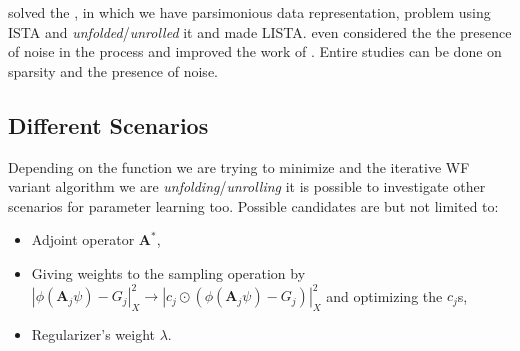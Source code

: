 \cite{Daubechies2003} solved the \srp\index{\srp}, in which we have parsimonious 
\cite{Foucart2013} data representation, problem using \ac{ISTA} and \cite{Gregor2010} 
\emph{unfolded}/\emph{unrolled} it and made \ac{LISTA}. 
\cite{Aberdam2020} even considered the the presence of noise in the process and improved the work of \cite{Gregor2010}. 
Entire studies can be done on sparsity and the presence of noise.

\subsection*{Different Scenarios}

Depending on the function we are trying to minimize and the iterative \ac{WF}\cite{Jaganathan2015}\cite{Liu2019} variant algorithm we are \emph{unfolding}/\emph{unrolling} 
it is possible to investigate other scenarios for parameter learning too. Possible candidates are but not limited to:
\begin{itemize}
  \item Adjoint operator $\boldsymbol{A}^*$,
  \item Giving weights to the sampling operation by $\left|\phi(\boldsymbol{A}_j\psi)-G_j\right|_X^2 \rightarrow \left|c_j \odot \left(\phi(\boldsymbol{A}_j\psi)-G_j\right)\right|_X^2$ and optimizing the $c_j$s,
  \item Regularizer's weight $\lambda$.
\end{itemize}
















